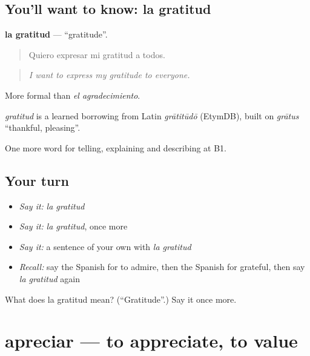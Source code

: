 \subsection*{You'll want to know: la gratitud}
\textbf{la gratitud} — \textquotedblleft{}gratitude\textquotedblright{}.

\begin{quote}
Quiero expresar mi gratitud a todos.
\end{quote}

\begin{quote}
\emph{I want to express my gratitude to everyone.}
\end{quote}

More formal than \emph{el agradecimiento}.

\begin{cousinweb}
\emph{gratitud} is a learned borrowing from Latin \emph{grātitūdō} (EtymDB), built on \emph{grātus} \textquotedblleft{}thankful, pleasing\textquotedblright{}.
\end{cousinweb}

\begin{grammarlens}[title={What you've built}]
One more word for telling, explaining and describing at B1.
\end{grammarlens}

\subsection*{Your turn}
\begin{itemize}
\raggedright
  \item \emph{Say it:} \emph{la gratitud}
  \item \emph{Say it:} \emph{la gratitud}, once more
  \item \emph{Say it:} a sentence of your own with \emph{la gratitud}
  \item \emph{Recall:} say the Spanish for to admire, then the Spanish for grateful, then say \emph{la gratitud} again
\end{itemize}

\begin{tcolorbox}[breakable,colback=teal!4,colframe=teal!35!black,title={Before you move on}]
What does la gratitud mean? (\textquotedblleft{}Gratitude\textquotedblright{}.) Say it once more.
\end{tcolorbox}
\section[apreciar]{apreciar — to appreciate, to value}

